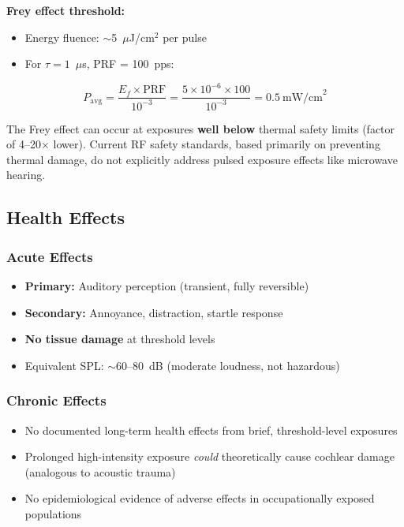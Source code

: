 \textbf{Frey effect threshold:}
\begin{itemize}
\item Energy fluence: $\sim$5~$\mu$J/cm$^2$ per pulse
\item For $\tau = 1$~$\mu$s, PRF = 100~pps:
\end{itemize}

\begin{equation}
P_{\text{avg}} = \frac{E_f \times \text{PRF}}{10^{-3}} = \frac{5 \times 10^{-6} \times 100}{10^{-3}} = 0.5~\text{mW/cm}^2
\end{equation}

\begin{keyconcept}
The Frey effect can occur at exposures \textbf{well below} thermal safety limits (factor of 4--20$\times$ lower). Current RF safety standards, based primarily on preventing thermal damage, do not explicitly address pulsed exposure effects like microwave hearing.
\end{keyconcept}

\subsection{Health Effects}

\subsubsection{Acute Effects}
\begin{itemize}
\item \textbf{Primary:} Auditory perception (transient, fully reversible)
\item \textbf{Secondary:} Annoyance, distraction, startle response
\item \textbf{No tissue damage} at threshold levels
\item Equivalent SPL: $\sim$60--80~dB (moderate loudness, not hazardous)
\end{itemize}

\subsubsection{Chronic Effects}
\begin{itemize}
\item No documented long-term health effects from brief, threshold-level exposures
\item Prolonged high-intensity exposure \emph{could} theoretically cause cochlear damage (analogous to acoustic trauma)
\item No epidemiological evidence of adverse effects in occupationally exposed populations
\end{itemize}

